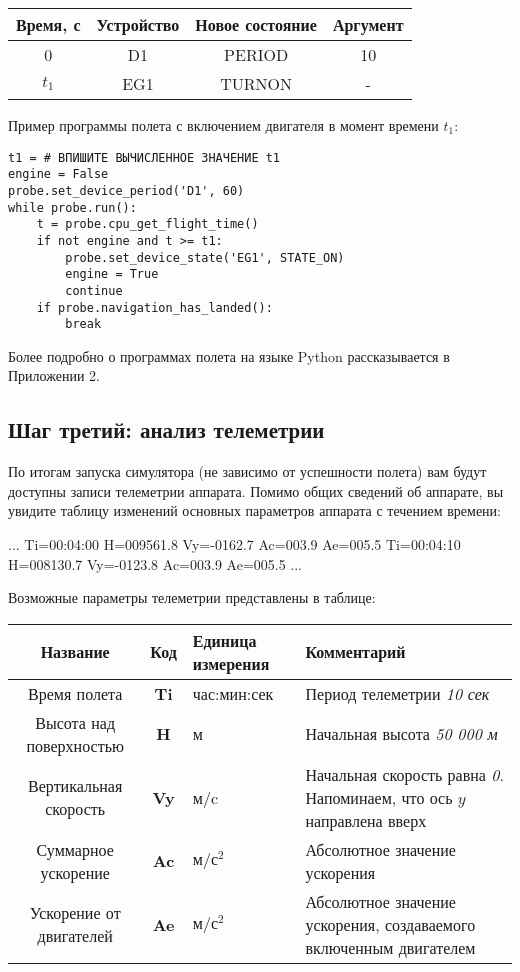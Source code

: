 \documentclass[12pt,a4paper]{article}
\begin{document}
\begin{center}
\begin{tabular}{ |c|c|c|c| } 
  \hline
  \textbf{Время, с} & \textbf{Устройство} & \textbf{Новое состояние} & \textbf{Аргумент} \\
  \hline
  0 & D1 & PERIOD & 10 \\
  \hline
  $t_1$ & EG1 & TURNON & - \\
  \hline
\end{tabular}
\end{center}

Пример программы полета с включением двигателя в момент времени $t_1$:

\begin{verbatim}
t1 = # ВПИШИТЕ ВЫЧИСЛЕННОЕ ЗНАЧЕНИЕ t1
engine = False
probe.set_device_period('D1', 60)
while probe.run():
    t = probe.cpu_get_flight_time()
    if not engine and t >= t1:
        probe.set_device_state('EG1', STATE_ON)
        engine = True
        continue
    if probe.navigation_has_landed():
        break
\end{verbatim}

Более подробно о программах полета на языке Python рассказывается в Приложении 2.

\subsection{Шаг третий: анализ телеметрии}

По итогам запуска симулятора (не зависимо от успешности полета) вам будут доступны записи
телеметрии аппарата. Помимо общих сведений об аппарате, вы увидите таблицу изменений
основных параметров аппарата с течением времени:

\begin{verbatim*}
...
Ti=00:04:00 H=009561.8 Vy=-0162.7 Ac=003.9 Ae=005.5
Ti=00:04:10 H=008130.7 Vy=-0123.8 Ac=003.9 Ae=005.5
...
\end{verbatim*}

Возможные параметры телеметрии представлены в таблице:

\begin{center}
\begin{tabular}{ |c|c|p{2.5cm}|p{6cm}| } 
  \hline
  \textbf{Название} & \textbf{Код} & \textbf{Единица измерения} & \textbf{Комментарий} \\
  \hline
  Время полета & \textbf{Ti} & час:мин:сек & Период телеметрии \emph{10 сек}\\
  \hline
  Высота над поверхностью & \textbf{H} & м & Начальная высота \emph{50 000 м}\\
  \hline
  Вертикальная скорость & \textbf{Vy} & м/c & Начальная скорость равна
  \emph{0}. Напоминаем, что ось $y$ направлена вверх\\
  \hline
  Суммарное ускорение & \textbf{Ac} & $\text{м}/\text{с}^{2}$ & Абсолютное значение ускорения\\
  \hline
  Ускорение от двигателей & \textbf{Ae} & $\text{м}/\text{с}^{2}$ & Абсолютное значение ускорения,
  создаваемого включенным двигателем\\
  \hline
\end{tabular}
\end{center}
\end{document}
